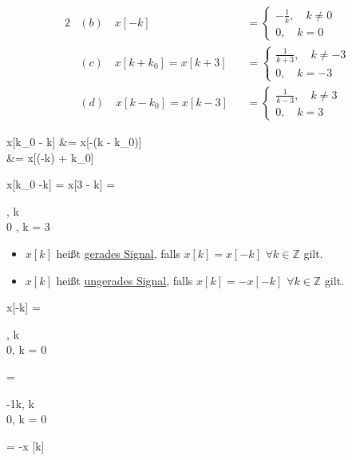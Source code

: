 \begin{tbox}
	\begin{alignat*}{2}
	&(b) \quad x[-k] &&= \begin{cases}
	-\frac1k,\quad k \ne 0 \\
	0,\quad k = 0
	\end{cases}
	\\
	&(c)\quad  x[k+k_0] = x[k+3] &&= \begin{cases}
	\frac{1}{k+3}, \quad k \ne -3 \\
	0, \quad k = -3
	\end{cases}\\
	&(d)\quad  x[k-k_0] = x[k-3] &&= \begin{cases}
	\frac{1}{k-3}, \quad k \ne 3 \\
	0, \quad k = 3
	\end{cases}
	\end{alignat*}
\end{tbox}

\begin{abox}
	x[k_0 - k] &= x[-(k - k_0)]\\
	&= x[(-k) + k_0]
\end{abox}

\begin{abox}
	 \quad x[k_0 -k] = x[3 - k] = \begin{cases}
		, \quad k \\0 , \quad k = 3
	\end{cases}
\end{abox}

\begin{tbox}
	\begin{itemize}
		\item $x[k]$ heißt \underline{gerades Signal}, falls $x[k] = x[-k]$ $\forall k \in \mathbb{Z}$ gilt.
		\item $x[k]$ heißt \underline{ungerades Signal}, falls $x[k] = -x[-k]$ $\forall k \in \mathbb{Z}$ gilt.
	\end{itemize}
\end{tbox}

\begin{abox}
	x[-k] = \begin{cases}
		, \quad k \ne 0\\
		0, \quad k = 0
	\end{cases} = \begin{cases}
		-\frac1k, \quad k  \\ 
		0, \quad k = 0 
	\end{cases}  = -x [k] 
\end{abox}


